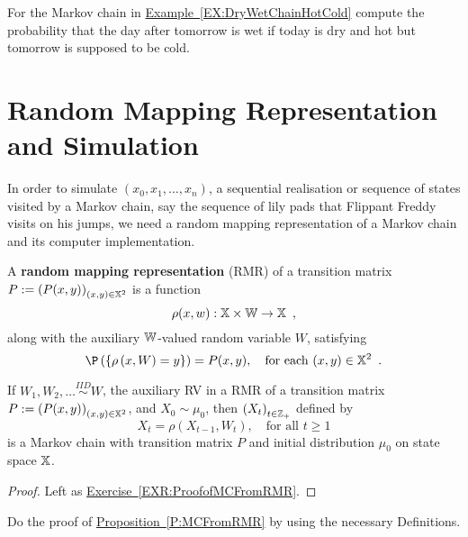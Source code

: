 \begin{exercise}\label{Exr:DryWetChainHotCold}
For the Markov chain in \hyperref[EX:DryWetChainHotCold]{Example~\ref*{EX:DryWetChainHotCold}}  compute the probability that the day after tomorrow is wet if today is dry and hot but tomorrow is supposed to be cold.
\end{exercise}

\section{Random Mapping Representation and Simulation}\label{S:FiniteMCRMRandSim}

In order to simulate $(x_0,x_1,\ldots,x_n)$, a sequential realisation or sequence of states visited by a Markov chain, say the sequence of lily pads that Flippant Freddy visits on his jumps, we need a random mapping representation of a Markov chain and its computer implementation.  

\begin{definition}\label{D:RMR}
A {\bf random mapping representation} (RMR) of a transition matrix $P := \left(P(x,y)\right)_{(x,y)\in\mathbb{X}^2}$ is a function 
\begin{equation}\label{E:RMRrho}
\rho(x,w): \mathbb{X} \times \mathbb{W} \to \mathbb{X} \enspace ,
\end{equation}
along with the auxiliary $\mathbb{W}$-valued random variable $W$, satisfying
\begin{equation}\label{E:RMRProbrho}
\P \left( \{ \rho \left( x,W \right) = y  \} \right) = P(x,y), \quad \text{for each } (x,y) \in \Xz^2 \enspace .
\end{equation}
\end{definition}

\begin{prop}\label{P:MCFromRMR}
If $W_1,W_2,\ldots \overset{IID}{\sim} W$, the auxiliary RV in  a RMR of a transition matrix $P := \left(P(x,y)\right)_{(x,y)\in\mathbb{X}^2}$, and  $X_0 \sim \mu_0$, then $\left(X_t\right)_{t\in\mathbb{Z}_+}$ defined by
\[
X_t = \rho \left(X_{t-1},W_t\right), \quad \text{for all } t \geq 1
\]
is a Markov chain with transition matrix $P$ and initial distribution $\mu_0$ on state space $\mathbb{X}$.
\begin{proof}
Left as \hyperref[EXR:ProofofMCFromRMR]{Exercise~\ref*{EXR:ProofofMCFromRMR}}.
\end{proof}
\end{prop}

\begin{exercise}\label{EXR:ProofofMCFromRMR}
Do the proof of \hyperref[P:MCFromRMR]{Proposition~\ref*{P:MCFromRMR}} by using the necessary Definitions.
\end{exercise}


